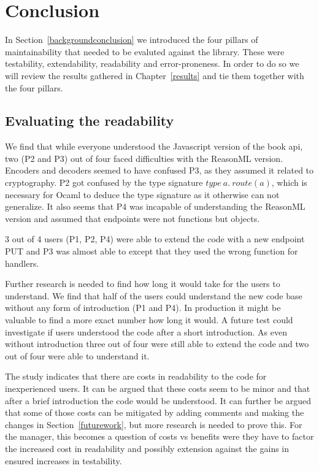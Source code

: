 \chapter{Conclusion}\label{conclusion}

In Section~\ref{backgroundconclusion} we introduced the four pillars of
maintainability that needed to be evaluted against the library. These were
testability, extendability, readability and error-proneness. In order to do so
we will review the results gathered in Chapter~\ref{results} and tie them
together with the four pillars.

\section{Evaluating the readability}

We find that while everyone understood the Javascript version of the book api,
two (P2 and P3) out of four faced difficulties with the ReasonML version.
Encoders and decoders seemed to have confused P3, as they assumed it related to
cryptography. P2 got confused by the type signature $type\ a.\ route(a)$, which
is necessary for Ocaml to deduce the type signature as it otherwise can not
generalize.  It also seems that P4 was incapable of understanding the ReasonML
version and assumed that endpoints were not functions but objects.

3 out of 4 users (P1, P2, P4) were able to extend the code with a new endpoint
PUT and P3 was almost able to except that they used the wrong function for
handlers.

Further research is needed to find how long it would take for the users to
understand.  We find that half of the users could understand the new code base
without any form of introduction (P1 and P4). In production it might be
valuable to find a more exact number how long it would. A future test could
investigate if users understood the code after a short introduction. As even
without introduction three out of four were still able to extend the code and
two out of four were able to understand it.

The study indicates that there are costs in readability to the code for
inexperienced users. It can be argued that these costs seem to be minor and that
after a brief introduction the code would be understood. It can further be
argued that some of those costs can be mitigated by adding comments and making
the changes in Section~\ref{futurework}, but more research is needed to prove
this. For the manager, this becomes a question of costs vs benefits were they
have to factor the increased cost in readability and possibly extension against
the gains in ensured increases in testability.

